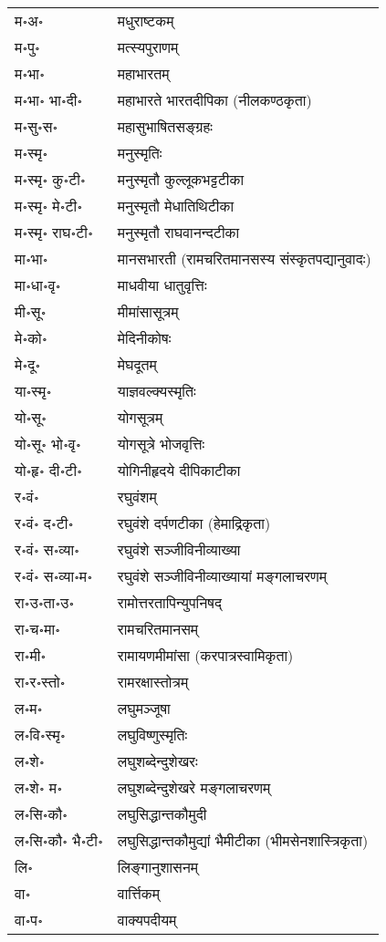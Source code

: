 \begin{longtable}{ll}
म॰अ॰ & मधुराष्टकम्\\
म॰पु॰ & मत्स्यपुराणम्\\
म॰भा॰ & महाभारतम्\\
म॰भा॰ भा॰दी॰ & महाभारते भारतदीपिका (नीलकण्ठकृता)\\
म॰सु॰स॰ & महासुभाषितसङ्ग्रहः\\
म॰स्मृ॰ & मनुस्मृतिः\\
म॰स्मृ॰ कु॰टी॰ & मनुस्मृतौ कुल्लूकभट्टटीका\\
म॰स्मृ॰ मे॰टी॰ & मनुस्मृतौ मेधातिथिटीका\\
म॰स्मृ॰ राघ॰टी॰ & मनुस्मृतौ राघवानन्दटीका\\
मा॰भा॰ & मानसभारती (रामचरितमानसस्य संस्कृतपद्यानुवादः)\\
मा॰धा॰वृ॰ & माधवीया धातुवृत्तिः\\
मी॰सू॰ & मीमांसासूत्रम्\\
मे॰को॰ & मेदिनीकोषः\\
मे॰दू॰ & मेघदूतम्\\
या॰स्मृ॰ & याज्ञवल्क्यस्मृतिः\\
यो॰सू॰ & योगसूत्रम्\\
यो॰सू॰ भो॰वृ॰ & योगसूत्रे भोजवृत्तिः\\
यो॰हृ॰ दी॰टी॰ & योगिनीहृदये दीपिकाटीका\\
र॰वं॰ & रघुवंशम्\\
र॰वं॰ द॰टी॰ & रघुवंशे दर्पणटीका (हेमाद्रिकृता)\\
र॰वं॰ स॰व्या॰ & रघुवंशे सञ्जीविनीव्याख्या\\
र॰वं॰ स॰व्या॰म॰ & रघुवंशे सञ्जीविनीव्याख्यायां मङ्गलाचरणम्\\
रा॰उ॰ता॰उ॰ & रामोत्तरतापिन्युपनिषद्\\
रा॰च॰मा॰ & रामचरितमानसम्\\
रा॰मी॰ & रामायणमीमांसा (करपात्रस्वामिकृता)\\
रा॰र॰स्तो॰ & रामरक्षास्तोत्रम्\\
ल॰म॰ & लघुमञ्जूषा\\
ल॰वि॰स्मृ॰ & लघुविष्णुस्मृतिः\\
ल॰शे॰ & लघुशब्देन्दुशेखरः\\
ल॰शे॰ म॰ & लघुशब्देन्दुशेखरे मङ्गलाचरणम्\\
ल॰सि॰कौ॰ & लघुसिद्धान्तकौमुदी\\
ल॰सि॰कौ॰ भै॰टी॰ & लघुसिद्धान्तकौमुद्यां भैमीटीका (भीमसेनशास्त्रिकृता)\\
लि॰ & लिङ्गानुशासनम्\\
वा॰ & वार्त्तिकम्\\
वा॰प॰ & वाक्यपदीयम्\\

\end{longtable}
